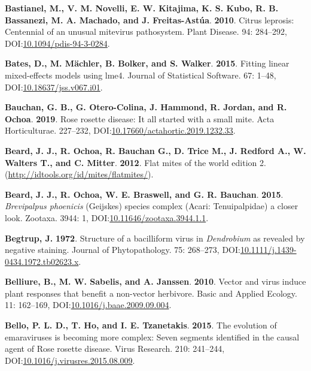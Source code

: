 \documentclass[12pt,final,CPage]{ufthesis}
\newlength{\cslhangindent}
\newenvironment{CSLReferences}[2] %
{%
	\setlength{\parindent}{0pt}
	\ifodd #1 \everypar{\setlength{\hangindent}{\cslhangindent}}\ignorespaces\fi
	\ifnum #2 > 0
	\setlength{\parskip}{#2\baselineskip}
	\fi
}%
{}
\begin{document}
{\begin{CSLReferences}{1}{0}
  \leavevmode{}%
  \textbf{Bastianel, M., V. M. Novelli, E. W. Kitajima, K. S. Kubo, R. B. Bassanezi, M. A. Machado, and J. Freitas-Astúa}. \textbf{2010}. {Citrus leprosis}: Centennial of an unusual mite{\textendash}virus pathosystem. Plant Disease. 94: 284--292, DOI:\href{https://doi.org/10.1094/pdis-94-3-0284}{10.1094/pdis-94-3-0284}.

  \leavevmode{}%
  \textbf{Bates, D., M. Mächler, B. Bolker, and S. Walker}. \textbf{2015}. Fitting linear mixed-effects models using {lme4}. Journal of Statistical Software. 67: 1--48, DOI:\href{https://doi.org/10.18637/jss.v067.i01}{10.18637/jss.v067.i01}.

  \leavevmode{}%
  \textbf{Bauchan, G. B., G. Otero-Colina, J. Hammond, R. Jordan, and R. Ochoa}. \textbf{2019}. {Rose rosette disease}: It all started with a small mite. Acta Horticulturae. 227--232, DOI:\href{https://doi.org/10.17660/actahortic.2019.1232.33}{10.17660/actahortic.2019.1232.33}.

  \leavevmode{}%
  \textbf{Beard, J. J., R. Ochoa, R. Bauchan G., D. Trice M., J. Redford A., W. Walters T., and C. Mitter}. \textbf{2012}. Flat mites of the world edition 2. (\url{http://idtools.org/id/mites/flatmites/}).

  \leavevmode{}%
  \textbf{Beard, J. J., R. Ochoa, W. E. Braswell, and G. R. Bauchan}. \textbf{2015}. {\emph{Brevipalpus phoenicis}} {(Geijskes)} species complex ({Acari}: {Tenuipalpidae}) \textemdash a closer look. Zootaxa. 3944: 1, DOI:\href{https://doi.org/10.11646/zootaxa.3944.1.1}{10.11646/zootaxa.3944.1.1}.

  \leavevmode{}%
  \textbf{Begtrup, J.} \textbf{1972}. Structure of a bacilliform virus in {\emph{Dendrobium}} as revealed by negative staining. Journal of Phytopathology. 75: 268--273, DOI:\href{https://doi.org/10.1111/j.1439-0434.1972.tb02623.x}{10.1111/j.1439-0434.1972.tb02623.x}.

  \leavevmode{}%
  \textbf{Belliure, B., M. W. Sabelis, and A. Janssen}. \textbf{2010}. Vector and virus induce plant responses that benefit a non-vector herbivore. Basic and Applied Ecology. 11: 162--169, DOI:\href{https://doi.org/10.1016/j.baae.2009.09.004}{10.1016/j.baae.2009.09.004}.

  \leavevmode{}%
  \textbf{Bello, P. L. D., T. Ho, and I. E. Tzanetakis}. \textbf{2015}. The evolution of emaraviruses is becoming more complex: Seven segments identified in the causal agent of {Rose rosette disease}. Virus Research. 210: 241--244, DOI:\href{https://doi.org/10.1016/j.virusres.2015.08.009}{10.1016/j.virusres.2015.08.009}.


\end{CSLReferences}}
\end{document}

